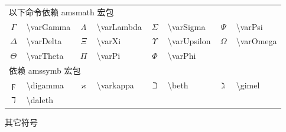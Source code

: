 \documentclass[a4paper]{ctexart}
\begin{document}
\begin{tabular}{clclclcl}
        \midrule
        \multicolumn{4}{l}{以下命令依赖 amsmath 宏包}\\
        $\varGamma$     & \textbackslash varGamma   & $\varLambda$  & \textbackslash varLambda  & 
        $\varSigma$     & \textbackslash varSigma   & $\varPsi$     & \textbackslash varPsi     \\
        $\varDelta$     & \textbackslash varDelta   & $\varXi$      & \textbackslash varXi      &
        $\varUpsilon$   & \textbackslash varUpsilon & $\varOmega$   & \textbackslash varOmega   \\
        $\varTheta$     & \textbackslash varTheta   & $\varPi$      & \textbackslash varPi      &
        $\varPhi$       & \textbackslash varPhi                                                 \\
        \midrule
        \multicolumn{4}{l}{依赖 amssymb 宏包}\\
        $\digamma$      & \textbackslash digamma    & $\varkappa$   & \textbackslash varkappa   &
        $\beth$         & \textbackslash beth       & $\gimel$‬      & \textbackslash gimel      \\ 
        $\daleth$       & \textbackslash daleth                                                 \\
        \bottomrule
    \end{tabular}\par
    其它符号\par
\end{document}
